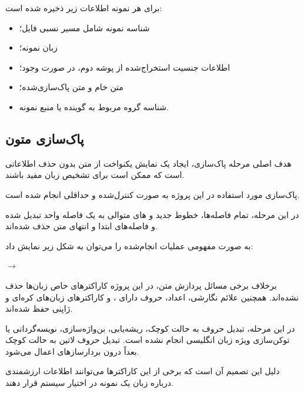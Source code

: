 برای هر نمونه اطلاعات زیر ذخیره شده است:

\begin{itemize}

	\item شناسه نمونه شامل مسیر نسبی فایل؛

	\item زبان نمونه؛

	\item اطلاعات جنسیت استخراج‌شده از پوشه دوم، در صورت وجود؛

	\item متن خام و متن پاک‌سازی‌شده؛

	\item شناسه گروه مربوط به گوینده یا منبع نمونه.

\end{itemize}


\subsection{پاک‌سازی متون}

هدف اصلی مرحله پاک‌سازی، ایجاد یک نمایش یکنواخت از متن بدون حذف اطلاعاتی است که ممکن است برای تشخیص زبان مفید باشند.

پاک‌سازی مورد استفاده در این پروژه به صورت کنترل‌شده و حداقلی انجام شده است.

در این مرحله، تمام فاصله‌ها، خطوط جدید و
های متوالی به یک فاصله واحد تبدیل شده و فاصله‌های ابتدا و انتهای متن حذف شده‌اند.

به صورت مفهومی عملیات انجام‌شده را می‌توان به شکل زیر نمایش داد:

\begin{center}
$\longrightarrow$
\end{center}

برخلاف برخی مسائل پردازش متن، در این پروژه کاراکترهای خاص زبان‌ها حذف نشده‌اند. همچنین علائم نگارشی، اعداد، حروف دارای
،
و کاراکترهای زبان‌های کره‌ای و ژاپنی حفظ شده‌اند.

در این مرحله، تبدیل حروف به حالت کوچک، ریشه‌یابی، بن‌واژه‌سازی، نویسه‌گردانی یا توکن‌سازی ویژه زبان انگلیسی انجام نشده است. تبدیل حروف لاتین به حالت کوچک بعداً درون بردارسازهای
اعمال می‌شود.

دلیل این تصمیم آن است که برخی از این کاراکترها می‌توانند اطلاعات ارزشمندی درباره زبان یک نمونه در اختیار سیستم قرار دهند.

